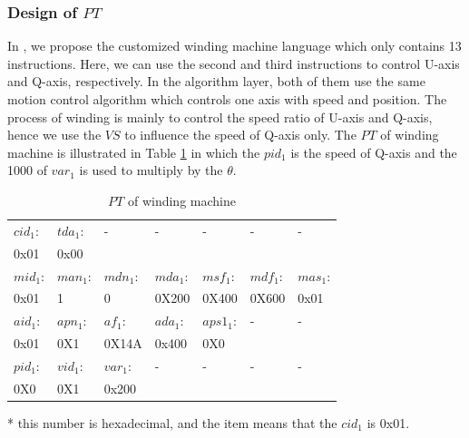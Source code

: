 \documentclass[journal,UTF8]{IEEEtran}
\begin{document}
\subsubsection{Design of $PT$}
In \cite{wu2018customized}, we propose the customized winding machine language which only contains 13 instructions. Here, we can use the second and third instructions to control U-axis and Q-axis, respectively. In the algorithm layer, both of them use the same motion control algorithm which controls one axis with speed and position. The process of winding is mainly to control the speed ratio of U-axis and Q-axis, hence we use the $VS$ to influence the speed of Q-axis only. The $PT$ of winding machine is illustrated in Table \ref{table:PTofWinding} in which the $pid_1$ is the speed of Q-axis and the 1000 of $var_1$ is used to multiply by the $\theta$.
\begin{table}
	\scriptsize \caption{$PT$ of winding machine}
	\label{table:PTofWinding}
	\begin{threeparttable}
		\renewcommand{\arraystretch}{1.4}
		\setlength\tabcolsep{3pt}
		\begin{tabular}{|p{1cm}|p{1cm}|p{1cm}|p{1cm}|p{1cm}|p{1cm}|p{1cm}|}
			\hline
			$cid_1$: & $tda_1:$   &- &-& -  &- &- \\
			0x01\tnote{*}&0x00&& &&&\\
			\hline
			$mid_1$:   & $man_1$: &$mdn_1$: &$mda_1$:&$msf_1$:& $mdf_1$:  & $mas_1$:\\
			0x01      & 1     &   0    &0X200   &0X400   & 0X600  &0x01 \\
			\hline
			$aid_1$:  & $apn_1$:& $af_1$: &$ada_1$: &$aps1_1$:  &-&-\\
			0x01     & 0X1    & 0X14A  &0x400 &0X0   & &\\
			\hline
			$pid_1$:  &$vid_1$: &$var_1$: &-  &-  &- &-\\
			0X0      & 0X1    & 0x200   &         &   & &\\
	    	\hline
		\end{tabular}
		\begin{tablenotes}
			\footnotesize
			\item[*] this number is hexadecimal, and the item means that the $cid_1$ is 0x01.
		\end{tablenotes}
	\end{threeparttable}
\end{table}
\end{document}
